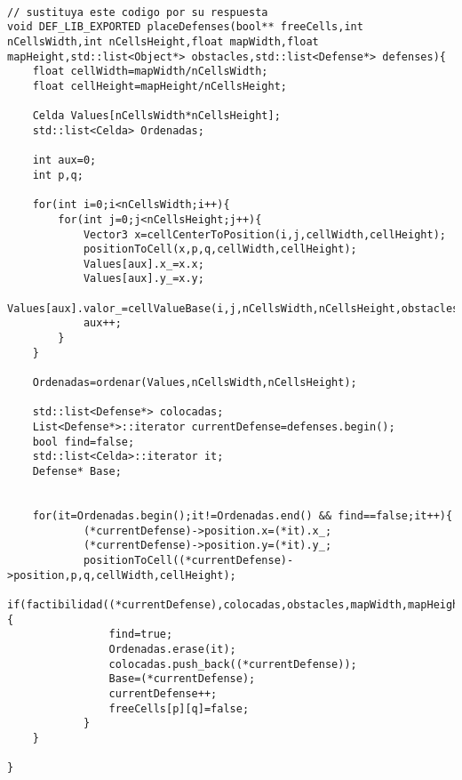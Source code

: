 \begin{lstlisting}

// sustituya este codigo por su respuesta
void DEF_LIB_EXPORTED placeDefenses(bool** freeCells,int nCellsWidth,int nCellsHeight,float mapWidth,float mapHeight,std::list<Object*> obstacles,std::list<Defense*> defenses){
    float cellWidth=mapWidth/nCellsWidth;
    float cellHeight=mapHeight/nCellsHeight;

	Celda Values[nCellsWidth*nCellsHeight];
	std::list<Celda> Ordenadas;

	int aux=0;
	int p,q;

	for(int i=0;i<nCellsWidth;i++){
		for(int j=0;j<nCellsHeight;j++){
			Vector3 x=cellCenterToPosition(i,j,cellWidth,cellHeight);
			positionToCell(x,p,q,cellWidth,cellHeight);
			Values[aux].x_=x.x;
			Values[aux].y_=x.y;
			Values[aux].valor_=cellValueBase(i,j,nCellsWidth,nCellsHeight,obstacles);
			aux++;
		}
	}

	Ordenadas=ordenar(Values,nCellsWidth,nCellsHeight);

	std::list<Defense*> colocadas;
    List<Defense*>::iterator currentDefense=defenses.begin();
	bool find=false;
	std::list<Celda>::iterator it;
	Defense* Base;


	for(it=Ordenadas.begin();it!=Ordenadas.end() && find==false;it++){
			(*currentDefense)->position.x=(*it).x_;
			(*currentDefense)->position.y=(*it).y_;
			positionToCell((*currentDefense)->position,p,q,cellWidth,cellHeight);
			if(factibilidad((*currentDefense),colocadas,obstacles,mapWidth,mapHeight,freeCells,p,q)){
				find=true;
				Ordenadas.erase(it);
				colocadas.push_back((*currentDefense));
				Base=(*currentDefense);
				currentDefense++;
				freeCells[p][q]=false;
			}
	}

}

\end{lstlisting}